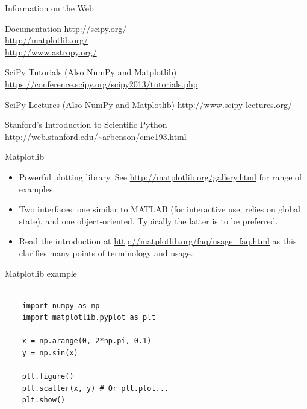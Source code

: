 \documentclass{beamer}
\begin{document}
\begin{frame}{Information on the Web}
  \begin{block}{Documentation}
    \url{http://scipy.org/} \\
    \url{http://matplotlib.org/} \\
    \url{http://www.astropy.org/}
  \end{block}

  \begin{block}{SciPy Tutorials (Also NumPy and Matplotlib)}
    \url{https://conference.scipy.org/scipy2013/tutorials.php}
  \end{block}
  
  \begin{block}{SciPy Lectures (Also NumPy and Matplotlib)}
    \url{http://www.scipy-lectures.org/}
  \end{block}
  
  \begin{block}{Stanford's Introduction to Scientific Python}
    \url{http://web.stanford.edu/~arbenson/cme193.html}
  \end{block}
  
\end{frame}

\begin{frame}{Matplotlib}
  \begin{itemize}
    \item Powerful plotting library. See \url{http://matplotlib.org/gallery.html} for range of examples.
    \item Two interfaces: one similar to MATLAB (for interactive use; relies on global state), and one object-oriented. Typically the latter is to be preferred.
    \item Read the introduction at \url{http://matplotlib.org/faq/usage_faq.html} as this clarifies many points of terminology and usage.
  \end{itemize} 
\end{frame}



\begin{frame}[fragile]{Matplotlib example}
  \begin{lstlisting}

    import numpy as np
    import matplotlib.pyplot as plt
  
    x = np.arange(0, 2*np.pi, 0.1)
    y = np.sin(x)
  
    plt.figure()
    plt.scatter(x, y) # Or plt.plot...
    plt.show()
  
  \end{lstlisting}
\end{frame}
\end{document}

